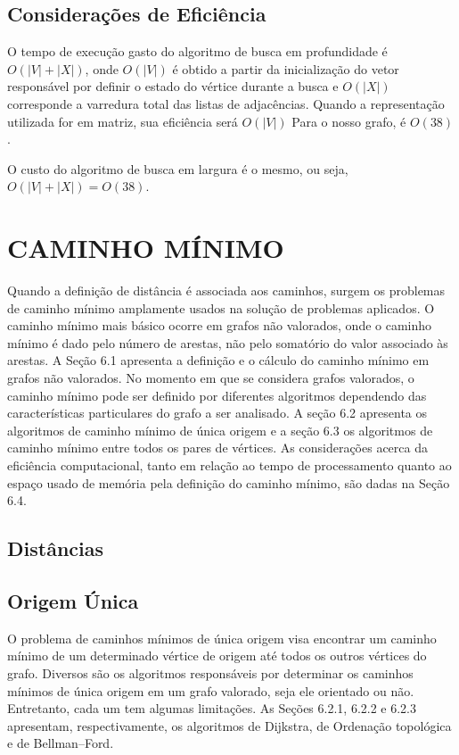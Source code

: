 \section{Considerações de Eficiência}\label{sec:eficienciaBusca}

O tempo de execução gasto do algoritmo de busca em profundidade é $ O(|V|+|X|) $, onde $ O(|V|) $ é obtido a partir da inicialização do vetor responsável por definir o estado do vértice durante a busca e $ O(|X|) $ corresponde a varredura total das listas de adjacências. Quando a representação utilizada for em matriz, sua eficiência será $ O(|V|) $
Para o nosso grafo, é $ O(38) $.

O custo do algoritmo de busca em largura é o mesmo, ou seja, $ O(|V| + |X|) = O(38) $.


\chapter{CAMINHO MÍNIMO}\label{cap:caminhoMinimo}
Quando a definição de distância é associada aos caminhos, surgem os problemas de
caminho mínimo amplamente usados na solução de problemas aplicados. O caminho mínimo
mais básico ocorre em grafos não valorados, onde o caminho mínimo é dado pelo número de
arestas, não pelo somatório do valor associado às arestas. A Seção 6.1 apresenta a definição
e o cálculo do caminho mínimo em grafos não valorados.
No momento em que se considera grafos valorados, o caminho mínimo pode ser definido por diferentes algoritmos dependendo das características particulares do grafo a ser analisado. A seção 6.2 apresenta os algoritmos de caminho mínimo de única origem e a seção 6.3
os algoritmos de caminho mínimo entre todos os pares de vértices. As considerações acerca
da eficiência computacional, tanto em relação ao tempo de processamento quanto ao espaço
usado de memória pela definição do caminho mínimo, são dadas na Seção 6.4.

\section{Distâncias}\label{sec:dist}

\section{Origem Única}\label{sec:oUnica}

O problema de caminhos mínimos de única origem visa encontrar um caminho mínimo
de um determinado vértice de origem até todos os outros vértices do grafo. Diversos são os
algoritmos responsáveis por determinar os caminhos mínimos de única origem em um grafo valorado, seja ele orientado ou não. Entretanto, cada um tem algumas limitações. As Seções 6.2.1,
6.2.2 e 6.2.3 apresentam, respectivamente, os algoritmos de Dijkstra, de Ordenação topológica
e de Bellman–Ford.

